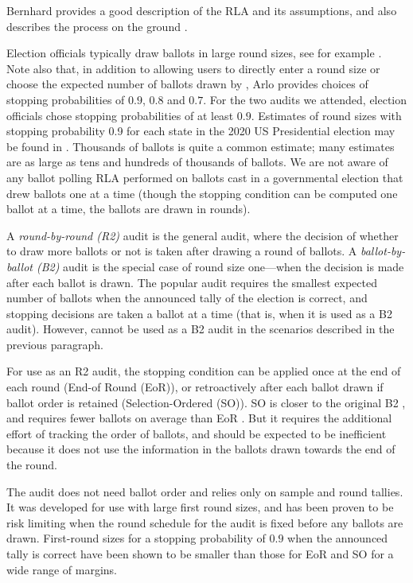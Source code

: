  Bernhard provides a good description of the RLA and its assumptions, and also describes the process on the ground \cite{bernhard-sok}. 

Election officials typically draw ballots in large round sizes, see for example \cite{va-2022,RI-report}. Note also that, in addition to allowing users to directly enter a round size or choose the expected number of ballots drawn by \BRAVO, Arlo provides choices of stopping probabilities of $0.9$, $0.8$ and $0.7$. For the two audits we attended, election officials chose stopping probabilities of at least $0.9$. Estimates of round sizes with stopping probability 0.9 for each state in the 2020 US Presidential election may be found in \cite{usenix_minerva}. Thousands of ballots is quite a common estimate; many estimates are as large as tens and hundreds of thousands of ballots. We are not aware of any ballot polling RLA performed on ballots cast in a governmental election that drew ballots one at a time (though the stopping condition can be computed one ballot at a time, the ballots are drawn in rounds). 

 A {\em round-by-round (R2)} audit is the general audit, where the decision of whether to draw more ballots or not is taken after drawing a round of ballots. A {\em ballot-by-ballot (B2)} audit is the special case of round size one---when the decision is made after each ballot is drawn. The popular \BRAVO audit requires the smallest expected number of ballots when the announced tally of the election is correct, and stopping decisions are taken a ballot at a time (that is, when it is used as a B2 audit). However, \BRAVO cannot be used as a B2 audit in the scenarios described in the previous paragraph. 

For use as an R2 audit, the \BRAVO stopping condition can be applied once at the end of each round (End-of Round (EoR)), or retroactively after each ballot drawn if ballot order is retained (Selection-Ordered (SO)). SO \BRAVO is closer to the original B2 \BRAVO, and requires fewer ballots on average than EoR \BRAVO. But it requires the additional effort of tracking the order of ballots, and should be expected to be inefficient because it does not use the information in the ballots drawn towards the end of the round. 

 The \Minerva audit \cite{usenix_minerva,arxiv_athena} does not need ballot order and relies only on sample and round tallies. It was developed for use with large first round sizes, and has been proven to be risk limiting when the round schedule for the audit is fixed before any ballots are drawn. First-round sizes for a stopping probability of $0.9$ when the announced tally is correct have been shown to be smaller than those for EoR and SO \BRAVO for a wide range of margins. 

